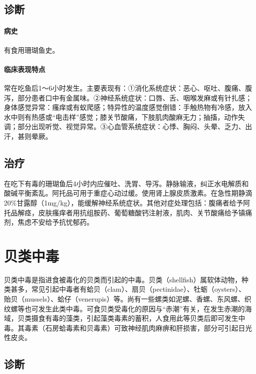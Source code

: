 \subsection{诊断}

\paragraph{病史}

有食用珊瑚鱼史。

\paragraph{临床表现特点}

常在吃鱼后1～6小时发生。主要表现有：①消化系统症状：恶心、呕吐、腹痛、腹泻，部分患者口中有金属味。②神经系统症状：口唇、舌、咽喉发麻或有针扎感；身体感觉异常：瘙痒或有蚁爬感；特异性的温度感觉倒错：手触热物有冷感，放入水中则有热感或“电击样”感觉；膝关节酸痛，下肢肌肉酸麻无力；抽搐，动作失调；部分出现听觉、视觉异常。③心血管系统症状：心悸、胸闷、头晕、乏力、出汗，甚则晕厥。

\subsection{治疗}

在吃下有毒的珊瑚鱼后4小时内应催吐、洗胃、导泻。静脉输液，纠正水电解质和酸碱平衡紊乱。阿托品可用于重症心动过缓。使用肾上腺皮质激素。在急性期静滴20\%甘露醇（1mg/kg），能缓解神经系统症状。其他对症处理包括：腹痛者给予阿托品解痉，皮肤瘙痒者用抗组胺药、葡萄糖酸钙注射液，肌肉、关节酸痛给予镇痛剂，焦虑不安给予抗忧郁药。

\protect\hypertarget{text00175.html}{}{}

\section{贝类中毒}

贝类中毒是指进食被毒化的贝类而引起的中毒。贝类（shellfish）属软体动物，种类甚多，常见引起中毒者有蛤贝（clam）、扇贝（pectinidae）、牡蛎（oysters）、贻贝（mussels）、蛤仔（venerupis）等。尚有一些螺类如泥螺、香螺、东风螺、织纹螺等也可发生此类中毒。可食贝类受毒化的原因与“赤潮”有关，在发生赤潮的海域，贝类摄食有毒的藻类，引起藻类毒素的蓄积，人食用此等贝类后即可发生中毒。其毒素（石房蛤毒素和贝毒素）可致神经肌肉麻痹和肝损害，部分可引起日光性皮炎。

\subsection{诊断}

